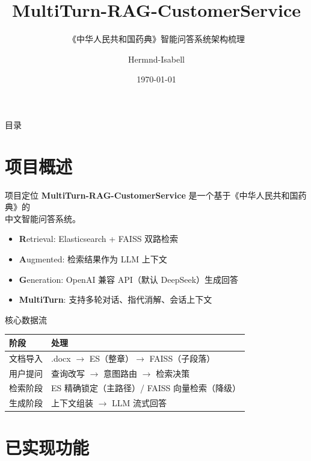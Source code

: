 \documentclass[aspectratio=169,11pt]{beamer}
\title{MultiTurn-RAG-CustomerService}
\subtitle{《中华人民共和国药典》智能问答系统架构梳理}
\author{Hermnd-Isabell}
\date{\today}
\begin{document}
\begin{frame}
    \titlepage
\end{frame}

\begin{frame}{目录}
    \tableofcontents
\end{frame}

\section{项目概述}

\begin{frame}{项目定位}
    \textbf{MultiTurn-RAG-CustomerService} 是一个基于《中华人民共和国药典》的\\中文智能问答系统。
    \vspace{0.5em}
    \begin{itemize}
        \item \textbf{R}etrieval: Elasticsearch + FAISS 双路检索
        \item \textbf{A}ugmented: 检索结果作为 LLM 上下文
        \item \textbf{G}eneration: OpenAI 兼容 API（默认 DeepSeek）生成回答
        \item \textbf{MultiTurn}: 支持多轮对话、指代消解、会话上下文
    \end{itemize}
\end{frame}

\begin{frame}{核心数据流}
    \centering
    \begin{tabular}{ll}
        \textbf{阶段} & \textbf{处理} \\
        \hline
        文档导入 & .docx $\rightarrow$ ES（整章）$\rightarrow$ FAISS（子段落） \\
        用户提问 & 查询改写 $\rightarrow$ 意图路由 $\rightarrow$ 检索决策 \\
        检索阶段 & ES 精确锁定（主路径）/ FAISS 向量检索（降级） \\
        生成阶段 & 上下文组装 $\rightarrow$ LLM 流式回答 \\
    \end{tabular}
\end{frame}

\section{已实现功能}
\end{document}
